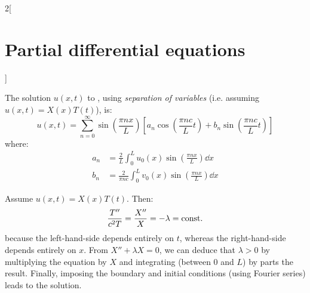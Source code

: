 \documentclass[../../../main_math.tex]{subfiles}
\begin{document}
\begin{multicols}{2}[\section{Partial differential equations}]
\begin{center}
\begin{minipage}{\linewidth}
      \label{PDE:waves-char-solve}
    \end{minipage}
  \end{center}
  \begin{proposition}
    The solution $u(x,t)$ to , using \emph{separation of variables} (i.e. assuming $u(x,t)=X(x)T(t)$), is: $$u(x,t)=\sum_{n=0}^\infty \sin\left(\frac{\pi n x}{L}\right)\left[a_n\cos\left(\frac{\pi n c}{L}t\right)+ b_n\sin\left( \frac{\pi n c}{L}t\right)\right]$$ where:
    \begin{align*}
      a_n & =\frac{2}{L}\int_{0}^Lu_0(x)\sin\left(\frac{\pi n x}{L}\right)\dd{x}       \\
      b_n & =\frac{2}{\pi n c}\int_{0}^Lv_0(x)\sin\left(\frac{\pi n x}{L}\right)\dd{x}
    \end{align*}
  \end{proposition}
  \begin{sproof}
    Assume $u(x,t)=X(x)T(t)$. Then: $$\frac{T''}{c^2T}=\frac{X''}{X}=-\lambda=\text{const.}$$ because the left-hand-side depends entirely on $t$, whereas the right-hand-side depends entirely on $x$. From $X''+\lambda X=0$, we can deduce that $\lambda>0$ by multiplying the equation by $X$ and integrating (between 0 and $L$) by parts the result. Finally, imposing the boundary and initial conditions (using Fourier series) leads to the solution.
  \end{sproof}

\end{multicols}
\end{document}
